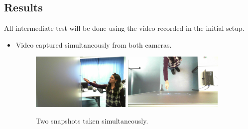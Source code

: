 \documentclass[a4paper,12pt]{article}
\begin{document}
\subsection{Results}

All intermediate test will be done using the video recorded in the initial setup. 
\begin{itemize}
\item Video captured simultaneously from both cameras. 
\begin{figure}[H]
    \begin{center}
	\includegraphics[width=0.45\textwidth]{FrameSide}
	\includegraphics[width=0.45\textwidth]{FrameUp}
	\caption{Two snapshots taken simultaneously.}

	\label{fig:video}
    \end{center}
\end{figure}


\end{itemize}
\end{document}
